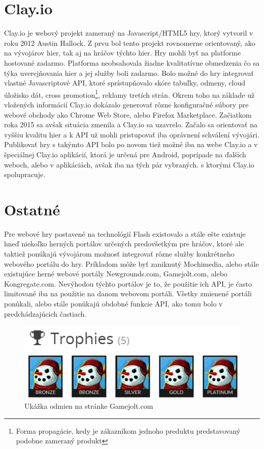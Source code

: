 \section{Clay.io}
Clay.io je webový projekt zameraný na Javascript/HTML5 hry, ktorý vytvoril v roku 2012 Austin Hallock. Z prvu bol tento projekt rovnomerne orientovaný, ako na vývojárov hier, tak aj na hráčov týchto hier. Hry mohli byť na platforme hostované zadarmo. Platforma neobsahovala žiadne kvalitatívne obmedzenia čo sa týka uverejňovania hier a jej služby boli zadarmo. Bolo možné do hry integrovať vlastné Javascriptové API, ktoré sprístupňovalo skóre tabuľky, odmeny, cloud úložisko dát, cross promotion\footnote{Forma propagácie, kedy je zákazníkom jednoho preduktu predstavovaný podobne zameraný produkt}, reklamy tretích strán. Okrem toho na základe už vložených informácií Clay.io dokázalo generovať rôzne konfiguračné súbory pre webové obchody ako Chrome Web Store, alebo Firefox Marketplace. Začiatkom roka 2015 sa avšak situácia zmenila a Clay.io sa uzavrelo. Začalo sa orientovať na vyššiu kvalitu hier a k API už mohli pristupovať iba oprávnení schválení vývojári. Publikovať hry s takýmto API bolo po novom tiež možné iba na webe Clay.io a v špeciálnej Clay.io aplikácií, ktorá je určená pre Android, poprípade na ďalších weboch, alebo v aplikáciách, avšak iba na tých pár vybraných. s ktorými Clay.io spolupracuje.    

\section{Ostatné}
Pre webové hry postavené na technológií Flash existovalo a stále ešte existuje hneď niekoľko herných portálov určených predovšetkým pre hráčov, ktoré ale taktiež ponúkajú vývojárom možnosť integrovať rôzne služby konkrétneho webového portálu do hry. Príkladom môže byť zaniknutý Mochimedia, alebo stále existujúce herné webové portály Newgrounds.com, Gamejolt.com, alebo Kongregate.com. Nevýhodou týchto portálov je to, že použitie ich API, je často limitované iba na použitie na danom webovom portáli. Všetky zmienené portáli ponúkali, alebo stále ponúkajú obdobné funkcie API, ako tomu bolo v predchádzajúcich častiach. 
\begin{figure}[h]
  \centering
  \includegraphics[scale=0.5]{fig/odmeny2.png}
  \caption{Ukážka odmien na stránke Gamejolt.com}
  \label{fig:odmeny}
\end{figure}


